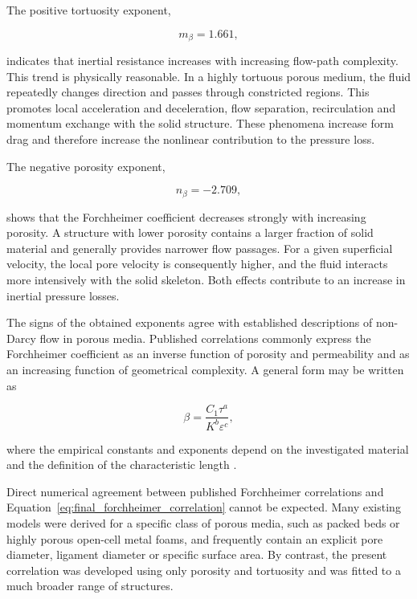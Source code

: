 \documentclass[a4paper]{article}
\begin{document}
The positive tortuosity exponent,

\begin{equation}
m_{\beta}
=
1.661,
\end{equation}

indicates that inertial resistance increases with increasing flow-path
complexity. This trend is physically reasonable. In a highly tortuous porous
medium, the fluid repeatedly changes direction and passes through constricted
regions. This promotes local acceleration and deceleration, flow separation,
recirculation and momentum exchange with the solid structure. These phenomena
increase form drag and therefore increase the nonlinear contribution to the
pressure loss.

The negative porosity exponent,

\begin{equation}
n_{\beta}
=
-2.709,
\end{equation}

shows that the Forchheimer coefficient decreases strongly with increasing
porosity. A structure with lower porosity contains a larger fraction of solid
material and generally provides narrower flow passages. For a given
superficial velocity, the local pore velocity is consequently higher, and the
fluid interacts more intensively with the solid skeleton. Both effects
contribute to an increase in inertial pressure losses.

The signs of the obtained exponents agree with established descriptions of
non-Darcy flow in porous media. Published correlations commonly express the
Forchheimer coefficient as an inverse function of porosity and permeability
and as an increasing function of geometrical complexity. A general form may be
written as

\begin{equation}
\beta
=
\frac{C_{1}\tau^{a}}
{K^{b}\varepsilon^{c}},
\label{eq:general_literature_forchheimer}
\end{equation}

where the empirical constants and exponents depend on the investigated
material and the definition of the characteristic length
\cite{Yang2021}.

Direct numerical agreement between published Forchheimer correlations and
Equation~\eqref{eq:final_forchheimer_correlation} cannot be expected. Many
existing models were derived for a specific class of porous media, such as
packed beds or highly porous open-cell metal foams, and frequently contain an
explicit pore diameter, ligament diameter or specific surface area. By
contrast, the present correlation was developed using only porosity and
tortuosity and was fitted to a much broader range of structures.
\end{document}
